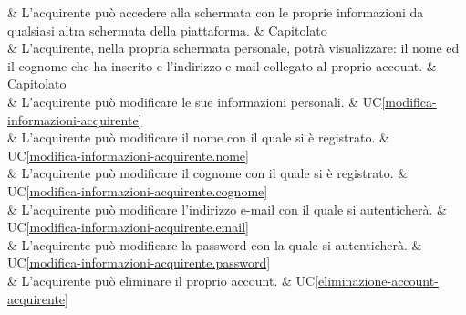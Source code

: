  & L'acquirente può accedere alla schermata con le proprie informazioni da qualsiasi altra schermata della piattaforma. & Capitolato \\

 & L'acquirente, nella propria schermata personale, potrà visualizzare: il nome ed il cognome che ha inserito e l'indirizzo e-mail collegato al proprio account. & Capitolato \\

 & L'acquirente può modificare le sue informazioni personali. & UC\ref{modifica-informazioni-acquirente} \\

 & L'acquirente può modificare il nome con il quale si è registrato. & UC\ref{modifica-informazioni-acquirente.nome} \\

 & L'acquirente può modificare il cognome con il quale si è registrato. & UC\ref{modifica-informazioni-acquirente.cognome} \\

 & L'acquirente può modificare l'indirizzo e-mail con il quale si autenticherà. & UC\ref{modifica-informazioni-acquirente.email} \\

 & L'acquirente può modificare la password con la quale si autenticherà. & UC\ref{modifica-informazioni-acquirente.password} \\

 & L'acquirente può eliminare il proprio account. & UC\ref{eliminazione-account-acquirente} \\







